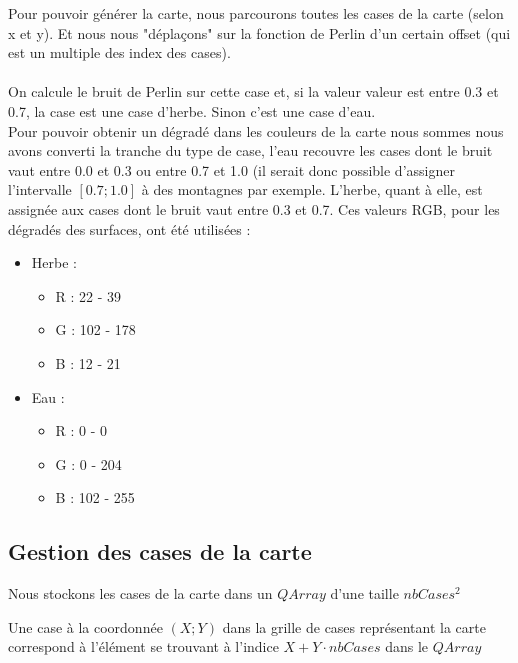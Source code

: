 \documentclass[a4paper,10pt,openany,oneside]{report}
\begin{document}
Pour pouvoir générer la carte, nous parcourons toutes les cases de la carte (selon x et y). Et nous nous "déplaçons" sur la fonction de Perlin d'un certain offset (qui est un multiple des index des cases). \paragraph{}
On calcule le bruit de Perlin sur cette case et, si la valeur valeur est entre 0.3 et 0.7, la case est une case d'herbe. Sinon c'est une case d'eau. \\
Pour pouvoir obtenir un dégradé dans les couleurs de la carte nous sommes nous avons converti la tranche du type de case, l'eau recouvre les cases dont le bruit vaut entre 0.0 et 0.3 ou entre 0.7 et 1.0 (il serait donc possible d'assigner l'intervalle $[0.7;1.0]$ à des montagnes par exemple. L'herbe, quant à elle, est assignée aux cases dont le bruit vaut entre 0.3 et 0.7. Ces valeurs RGB, pour les dégradés des surfaces, ont été utilisées :
\begin{itemize}
	\item Herbe :
	\begin{itemize}
		\item R : 22 - 39
		\item G : 102 - 178
		\item B : 12 - 21
	\end{itemize}
	\item Eau :
	\begin{itemize}
		\item R : 0 - 0
		\item G : 0 - 204
		\item B : 102 - 255
	\end{itemize}
\end{itemize}
\subsection{Gestion des cases de la carte}
Nous stockons les cases de la carte dans un $QArray$ d'une taille $nbCases^{2}$

Une case à la coordonnée $(X;Y)$ dans la grille de cases représentant la carte correspond à l'élément se trouvant à l'indice $X+Y \cdot nbCases$ dans le $QArray$
\end{document}
